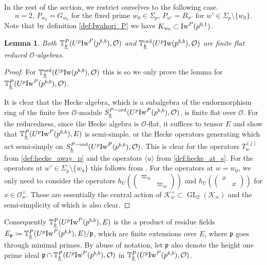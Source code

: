 \documentclass[leqno]{amsart}
\newtheorem{lem}[thm]{Lemma}
\theoremstyle{definition}
\theoremstyle{remark}
\newcommand{\smat}[1]{\left(\begin{smallmatrix} #1 \end{smallmatrix}\right)}
\newcommand{\oo}{\mathcal{O}}
\DeclareMathOperator{\GL}{GL}
\newcommand{\fp}{\mathfrak{p}}
\newcommand{\K}{{\mathcal{K}}} %
\newcommand{\wt}[1]{\underline{ #1 }}
\newcommand{\Iw}{\textnormal{Iw}} %
\newcommand{\TT}{\mathbb{T}} %
\newcommand{\ord}{\textnormal{ord}} %
\begin{document}
In the rest of the section,
we restrict ourselves to the following case.
\begin{equation}\label{cond:parabolic}\tag{P}
	n=2,\, 
	P_{w_0}=G_{w_0} \text{ for the fixed prime }w_0\in \Sigma_p,\,
	P_{w'}=B_{w'} \text{ for } w'\in \Sigma_p\setminus\{w_0\}.
\end{equation}
Note that by definition \eqref{def:Iwahori_P}
we have $K_{w_0}\subset \Iw^P(p^{0,1})$.


\begin{lem}\label{lem:hecke_red}
Both
$\TT^P_{\wt{k}}(U^p\Iw^P(p^{b,b}),\oo)$ and
$\TT^{\ord}_{\wt{k}}(U^p\Iw(p^{b,b}),\oo)$
are finite flat reduced $\oo$-algebras.
\end{lem}
\begin{proof}
For $\TT^{\ord}_{\wt{k}}(U^p\Iw(p^{b,b}),\oo)$
this is \cite[Lem 2.14]{ger}
so we only prove the lemma for
$\TT^P_{\wt{k}}(U^p\Iw^P(p^{b,b}),\oo)$.

It is clear that the Hecke algebra,
which is a subalgebra of the endormorphism ring
of the finite free $\oo$-module
$S^{P-\ord}_{\wt{k}}(U^p\Iw^P(p^{b,b}),\oo)$,
is finite flat over $\oo$.
For the reducedness,
since the Hecke algebra is $\oo$-flat,
it suffices to tensor $E$ and show that 
$\TT^P_{\wt{k}}(U^p\Iw^P(p^{b,b}),E)$
is semi-simple,
or the Hecke operators
generating which act semi-simply on 
$S^{P-\ord}_{\wt{k}}(U^p\Iw^P(p^{b,b}),\oo)$.
This is clear for 
the operators $T_{w}^{(j)}$ from \eqref{def:hecke_away_p}
and the operators $\langle u\rangle $
from \eqref{def:hecke_at_s}.
For the operators at $w'\in\Sigma_p\setminus\{w_0\}$
this follows from \cite[Lem 2.14]{ger}.
For the operators at $w=w_0$,
we only need to consider the operators
$h_U(\smat{\varpi_{w}&\\&\varpi_w})$ and
$h_U(\smat{x&\\&x})$ for $x\in \oo_w^\times$.
These are essentially the central action
of $\K_w^\times\subset \GL_2(\K_w)$
and the semi-simplicity of which is also clear.

\end{proof}

Consequently $\TT^P_{\wt{k}}(U^p\Iw^P(p^{b,b}),E)$
is the a product of residue fields 
$E_{\fp}\coloneqq \TT^P_{\wt{k}}(U^p\Iw^P(p^{b,b}),E)/\fp$,
which are finite extensions over $E$,
where $\fp$ goes through minimal primes.
By abuse of notation, let $\fp$ also denote 
the height one prime ideal 
$\fp\cap \TT^P_{\wt{k}}(U^p\Iw^P(p^{b,b}),\oo)$
in $\TT^P_{\wt{k}}(U^p\Iw^P(p^{b,b}),\oo)$.
\end{document}
